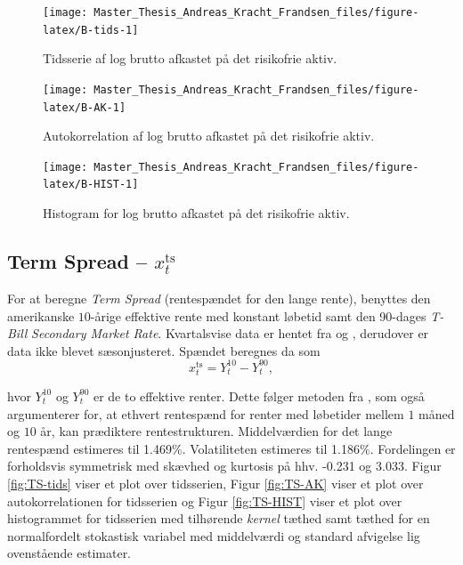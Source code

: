 \documentclass[
  a4paper,
  oneside]{memoir}
\begin{document}
\begin{figure}[H]

{\centering \texttt{[image: Master\_Thesis\_Andreas\_Kracht\_Frandsen\_files/figure-latex/B-tids-1]} 

}

\caption{Tidsserie af log brutto afkastet på det risikofrie aktiv.}\label{fig:B-tids}
\end{figure}

\begin{figure}[H]

{\centering \texttt{[image: Master\_Thesis\_Andreas\_Kracht\_Frandsen\_files/figure-latex/B-AK-1]} 

}

\caption{Autokorrelation af log brutto afkastet på det risikofrie aktiv.}\label{fig:B-AK}
\end{figure}

\begin{figure}[H]

{\centering \texttt{[image: Master\_Thesis\_Andreas\_Kracht\_Frandsen\_files/figure-latex/B-HIST-1]} 

}

\caption{Histogram for log brutto afkastet på det risikofrie aktiv.}\label{fig:B-HIST}
\end{figure}

\hypertarget{term-spread-x_ttextts}{%
\subsection{\texorpdfstring{Term Spread -- \(x_t^{\text{ts}}\)}{Term Spread -- x\_t\^{}\{\textbackslash text\{ts\}\}}}\label{term-spread-x_ttextts}}

For at beregne \emph{Term Spread} (rentespændet for den lange rente), benyttes den amerikanske \(10\)-årige effektive rente med konstant løbetid samt den 90-dages \emph{T-Bill} \emph{Secondary Market Rate}. Kvartalsvise data er hentet fra \citep{FRED102020} og \citep{FRED902020}, derudover er data ikke blevet sæsonjusteret. Spændet beregnes da som
\[x_t^{\text{ts}}=Y_t^{10}-Y_t^{90},\]

hvor \(Y_t^{10}\) og \(Y_t^{90}\) er de to effektive renter. Dette følger metoden fra \citep{Campbell1991}, som også argumenterer for, at ethvert rentespænd for renter med løbetider mellem \(1\) måned og \(10\) år, kan prædiktere rentestrukturen. Middelværdien for det lange rentespænd estimeres til 1.469\(\%\). Volatiliteten estimeres til 1.186\(\%\). Fordelingen er forholdsvis symmetrisk med skævhed og kurtosis på hhv. -0.231 og 3.033. Figur \ref{fig:TS-tids} viser et plot over tidsserien, Figur \ref{fig:TS-AK} viser et plot over autokorrelationen for tidsserien og Figur \ref{fig:TS-HIST} viser et plot over histogrammet for tidsserien med tilhørende \emph{kernel} tæthed samt tæthed for en normalfordelt stokastisk variabel med middelværdi og standard afvigelse lig ovenstående estimater.
\end{document}
